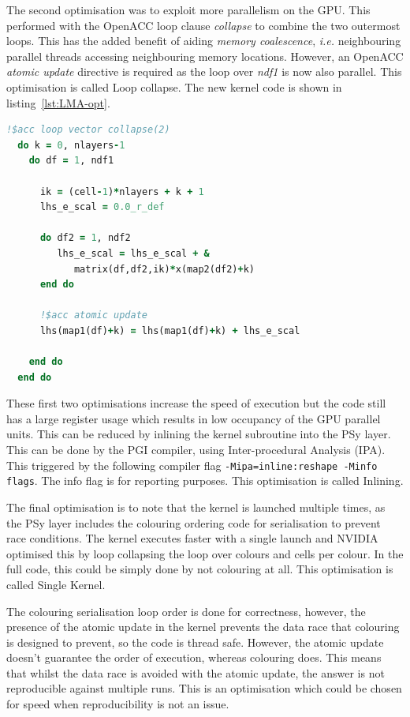 The second optimisation was to exploit more parallelism on the GPU.
This performed with the OpenACC loop clause {\em collapse} to combine
the two outermost loops. This has the added benefit of aiding {\em
  memory coalescence}, {\em i.e.} neighbouring parallel threads
accessing neighbouring memory locations. However, an OpenACC {\em
  atomic update} directive is required as the loop over {\em ndf1} is
now also parallel. This optimisation is called Loop collapse. The new
kernel code is shown in listing~\ref{lst:LMA-opt}. 

\begin{lstlisting}[language=Fortran,caption={Optimised
    kernel},label={lst:LMA-opt}]
  !$acc loop vector collapse(2)
  do k = 0, nlayers-1
    do df = 1, ndf1

      ik = (cell-1)*nlayers + k + 1
      lhs_e_scal = 0.0_r_def

      do df2 = 1, ndf2
         lhs_e_scal = lhs_e_scal + & 
            matrix(df,df2,ik)*x(map2(df2)+k)
      end do
      
      !$acc atomic update
      lhs(map1(df)+k) = lhs(map1(df)+k) + lhs_e_scal

    end do
  end do
\end{lstlisting}

These first two optimisations increase the speed of execution but the
code still has a large register usage which results in low occupancy
of the GPU parallel units. This can be reduced by inlining the kernel
subroutine into the PSy layer. This can be done by the PGI compiler,
using Inter-procedural Analysis (IPA). This triggered by the following
compiler flag \verb+-Mipa=inline:reshape -Minfo flags+. The info flag
is for reporting purposes. This optimisation is called Inlining. 

The final optimisation is to note that the kernel is launched multiple
times, as the PSy layer includes the colouring ordering code for serialisation
to prevent race conditions. The kernel executes faster with a
single launch and NVIDIA optimised this by loop collapsing the loop
over colours and cells per colour. In the full code, this could be
simply done by not colouring at all. This optimisation is called
Single Kernel.

The colouring serialisation loop order is done for correctness,
however, the presence of the atomic update in the kernel prevents the
data race that colouring is designed to prevent, so the code is thread
safe. However, the atomic update doesn't guarantee the order of
execution, whereas colouring does. This means that whilst the data
race is avoided with the atomic update, the answer is not reproducible against
multiple runs. This is an optimisation which could be chosen for speed
when reproducibility is not an issue.

